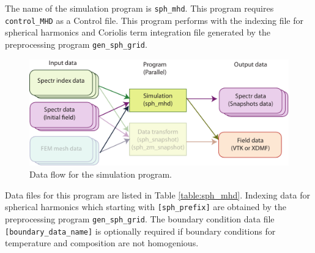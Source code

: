 The name of the simulation program is {\tt sph\_mhd}. This program requires {\tt control\_MHD} as a Control file. This program performs with the indexing file for spherical harmonics and Coriolis term integration file generated by the preprocessing program {\tt gen\_sph\_grid}.
%
\begin{figure}[htbp]
\begin{center}
\includegraphics*[width=130mm]{images/flow_2}
\end{center}
\caption{Data flow for the simulation program.}
\label{fig:flow_2}
\end{figure}
%
Data files for this program are listed in Table \ref{table:sph_mhd}. Indexing data for spherical harmonics which starting with \verb|[sph_prefix]| are obtained by the preprocessing program \verb|gen_sph_grid|. The boundary condition data file \verb|[boundary_data_name]| is optionally required if boundary conditions for temperature and composition are not homogenious.
%
